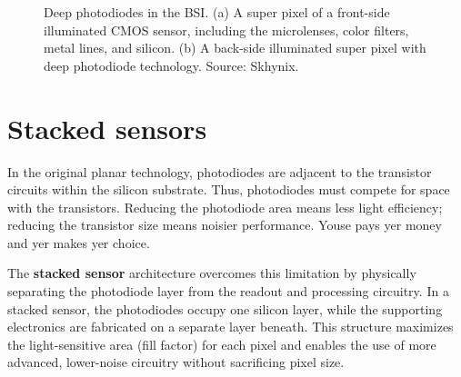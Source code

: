\documentclass[
  letterpaper,
]{book}
\begin{document}
\begin{figure}


\caption{\label{fig-sensor-skhynix}Deep photodiodes in the BSI. (a) A
super pixel of a front-side illuminated CMOS sensor, including the
microlenses, color filters, metal lines, and silicon. (b) A back-side
illuminated super pixel with deep photodiode technology. Source:
Skhynix.}

\end{figure}%

\section{Stacked sensors}\label{sec-sensor-stacked}

In the original planar technology, photodiodes are adjacent to the
transistor circuits within the silicon substrate. Thus, photodiodes must
compete for space with the transistors. Reducing the photodiode area
means less light efficiency; reducing the transistor size means noisier
performance. Youse pays yer money and yer makes yer choice.

The \textbf{stacked sensor} architecture overcomes this limitation by
physically separating the photodiode layer from the readout and
processing circuitry. In a stacked sensor, the photodiodes occupy one
silicon layer, while the supporting electronics are fabricated on a
separate layer beneath. This structure maximizes the light-sensitive
area (fill factor) for each pixel and enables the use of more advanced,
lower-noise circuitry without sacrificing pixel size.
\end{document}
